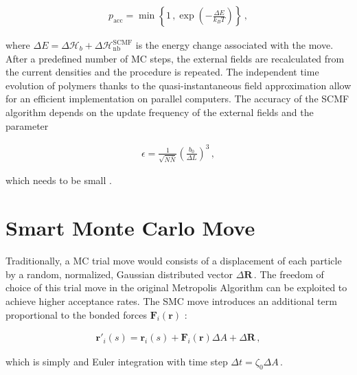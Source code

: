 \documentclass[bachelor,       %
               oneside,        %
               BCOR10mm,       %
               ngerman, english %
               ]{GAUBM}
\begin{document}
\begin{align}
    p_{\text{acc}}=\min\left\{1\,,\exp\left(-\frac{\Delta E}{k_BT}\right)\right\}\,,
    \label{eq:metropolis_mc}
\end{align}

where $\Delta E=\Delta\mathcal H_b+\Delta\mathcal H_{\text{nb}}^{\text{SCMF}}$ is the energy change associated with the move. After a predefined number of \ac{MC} steps, the external fields are recalculated from the current densities and the procedure is repeated. The independent time evolution of polymers thanks to the quasi-instantaneous field approximation allow for an efficient implementation on parallel computers. The accuracy of the \ac{SCMF} algorithm depends on the update frequency of the external fields and the parameter

\begin{align}
    \epsilon=\frac{1}{\sqrt{N\bar N}}\left(\frac{b_0}{\Delta L}\right)^3\,,
\end{align}

which needs to be small \cite{Schneider_soma}.

\section{Smart Monte Carlo Move}

Traditionally, a \ac{MC} trial move would consists of a displacement of each particle by a random, normalized, Gaussian distributed vector $\Delta\mathbf R\,.$ The freedom of choice of this trial move in the original Metropolis Algorithm \cite{metropolis} can be exploited to achieve higher acceptance rates. The \ac{SMC} move introduces an additional term proportional to the bonded forces $\mathbf{F}_i(\mathbf r)$ \cite{smc, mueller_deltat}:

\begin{align}
    \mathbf{r'}_i(s)=\mathbf{r}_i(s)+\mathbf{F}_i(\mathbf r)\Delta A+\Delta\mathbf R\,,
\end{align}

which is simply and Euler integration with time step $\Delta t=\zeta_0\Delta A\,.$



\end{document}
